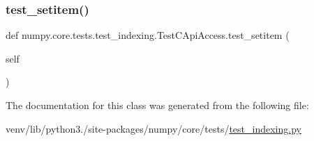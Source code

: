 \mbox{\label{classnumpy_1_1core_1_1tests_1_1test__indexing_1_1TestCApiAccess_a27d839744b8f9f2f30d5af3bbc61f147}} 
\subsubsection{\texorpdfstring{test\+\_\+setitem()}{test\_setitem()}}
{\footnotesize\ttfamily def numpy.\+core.\+tests.\+test\+\_\+indexing.\+Test\+C\+Api\+Access.\+test\+\_\+setitem (\begin{DoxyParamCaption}\item[{}]{self }\end{DoxyParamCaption})}



The documentation for this class was generated from the following file\+:\begin{DoxyCompactItemize}
\item 
venv/lib/python3./site-\/packages/numpy/core/tests/\hyperlink{test__indexing_8py}{test\+\_\+indexing.\+py}\end{DoxyCompactItemize}
